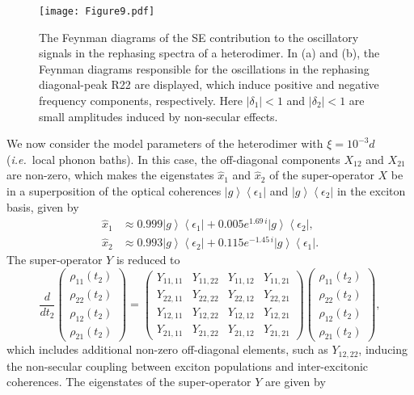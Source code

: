 \documentclass[%
 reprint,%
 amssymb, amsmath,%
 aip,cha,%
]{revtex4-1}
\newcommand{\bra}[1]{\ensuremath{\left\langle{#1}\right\vert}}
\newcommand{\ket}[1]{\ensuremath{\left|{#1}\right\rangle}}
\newcommand{\abs}[1]{\left|#1\right|}
\begin{document}
\begin{figure}[ht!]
	\texttt{[image: Figure9.pdf]}
	\caption{The Feynman diagrams of the SE contribution to the oscillatory signals in the rephasing spectra of a heterodimer. In (a) and (b), the Feynman diagrams responsible for the oscillations in the rephasing diagonal-peak R22 are displayed, which induce positive and negative frequency components, respectively. Here $\abs{\delta_1}<1$ and $\abs{\delta_2}<1$ are small amplitudes induced by non-secular effects.}
	\label{figureindex9} 
\end{figure}

We now consider the model parameters of the heterodimer with $\xi=10^{-3}d$ ({\it i.e.}~local phonon baths). In this case, the off-diagonal components $X_{12}$ and $X_{21}$ are non-zero, which makes the eigenstates $\hat{x}_{1}$ and $\hat{x}_{2}$ of the super-operator $X$ be in a superposition of the optical coherences $\ket{g}\bra{\epsilon_1}$ and $\ket{g}\bra{\epsilon_2}$ in the exciton basis, given by
\begin{align}
\hat{x}_{1}&\approx 0.999\ket{g}\bra{\epsilon_1}+0.005 e^{1.69\,i}\ket{g}\bra{\epsilon_2},\\
\hat{x}_{2}&\approx 0.993\ket{g}\bra{\epsilon_2}+0.115 e^{-1.45\,i}\ket{g}\bra{\epsilon_1}.
\end{align}
The super-operator $Y$ is reduced to
\begin{equation}
\frac{d}{dt_2}
\begin{pmatrix}
\rho_{11}(t_2) \\ \rho_{22}(t_2) \\ \rho_{12}(t_2) \\ \rho_{21}(t_2)
\end{pmatrix}
=
\begin{pmatrix}
Y_{11,11} & Y_{11,22} & Y_{11,12} & Y_{11,21} \\
Y_{22,11} & Y_{22,22} & Y_{22,12} & Y_{22,21} \\
Y_{12,11} & Y_{12,22} & Y_{12,12} & Y_{12,21} \\
Y_{21,11} & Y_{21,22} & Y_{21,12} & Y_{21,21}
\end{pmatrix}
\begin{pmatrix}
\rho_{11}(t_2) \\ \rho_{22}(t_2) \\ \rho_{12}(t_2) \\ \rho_{21}(t_2)
\end{pmatrix},
\end{equation}
which includes additional non-zero off-diagonal elements, such as $Y_{12,22}$, inducing the non-secular coupling between exciton populations and inter-excitonic coherences. The eigenstates of the super-operator $Y$ are given by
\end{document}
